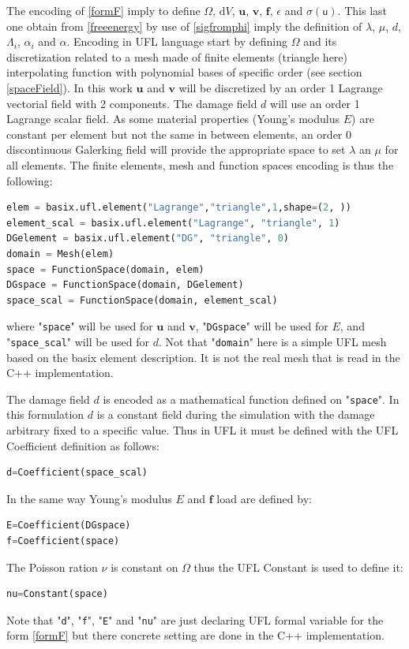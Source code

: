 \documentclass[12pt]{article}
\newcommand{\vm}[1]{
	{\ensuremath{\mathbf{#1}}}
}
\newcommand{\tens}[1]{
	{\ensuremath{\mathsf{#1}}}
}
\newcommand{\mycodepy}[1]{\textsf{"}\lstinline[language=Python]`#1`\textsf{"}}
\begin{document}
The encoding of \eqref{formF} imply to define $\Omega$, $\mathrm{d}V$, $\vm{u}$, $\vm{v}$, $\vm{f}$, $\tens{\epsilon}$ and $\tens{\sigma \left( u \right)}$. This last one obtain from \eqref{freeenergy} by use of \eqref{sigfromphi} imply the definition of $\lambda$, $\mu$, $d$, $\Lambda_i$, $\alpha_i$ and $\alpha$.
Encoding in UFL language start by defining $\Omega$ and its discretization related to a mesh made of finite elements (triangle here) interpolating function with polynomial bases of specific order (see section \ref{spaceField}). In this work $\vm{u}$ and $\vm{v}$ will be discretized by an order 1 Lagrange vectorial field with 2 components. The damage field $d$ will use an order 1 Lagrange scalar field. 
As some material properties (Young's modulus $E$) are constant per element  but not the same in between elements, an order 0 discontinuous Galerking field will provide the appropriate space to set $\lambda$ an $\mu$ for all elements.
The finite elements, mesh and function spaces encoding is thus the following:
\begin{lstlisting}[numbers=none,basicstyle=\footnotesize,language=Python]
elem = basix.ufl.element("Lagrange","triangle",1,shape=(2, ))
element_scal = basix.ufl.element("Lagrange", "triangle", 1)
DGelement = basix.ufl.element("DG", "triangle", 0)
domain = Mesh(elem)
space = FunctionSpace(domain, elem)
DGspace = FunctionSpace(domain, DGelement)
space_scal = FunctionSpace(domain, element_scal)
\end{lstlisting}
where  \mycodepy{space} will be used for $\vm{u}$ and $\vm{v}$, \mycodepy{DGspace} will be used for $E$,
and \mycodepy{space_scal} will be used for $d$. Not that \mycodepy{domain} here is a simple UFL mesh based on the basix element description. It is not the real mesh that is read in the C++ implementation.


The damage field $d$ is encoded as a mathematical function defined on \mycodepy{space}.
In this formulation $d$ is a constant field during the simulation with the damage  arbitrary fixed to a specific  value. Thus in UFL it must be defined with the UFL Coefficient definition as follows:
\begin{lstlisting}[numbers=none,basicstyle=\footnotesize,language=Python]
d=Coefficient(space_scal)
\end{lstlisting}
 
In the same way Young's modulus $E$ and $\vm{f}$ load are defined by:
\begin{lstlisting}[numbers=none,basicstyle=\footnotesize,language=Python]
E=Coefficient(DGspace)
f=Coefficient(space)
\end{lstlisting}
The Poisson ration $\nu$ is constant on $\Omega$ thus the UFL Constant  is used to define it:
\begin{lstlisting}[numbers=none,basicstyle=\footnotesize,language=Python]
nu=Constant(space)
\end{lstlisting}
Note that \mycodepy{d}, \mycodepy{f}, \mycodepy{E} and \mycodepy{nu} are just declaring UFL formal variable for the form \eqref{formF} but there concrete setting are done in the C++ implementation.
\end{document}
